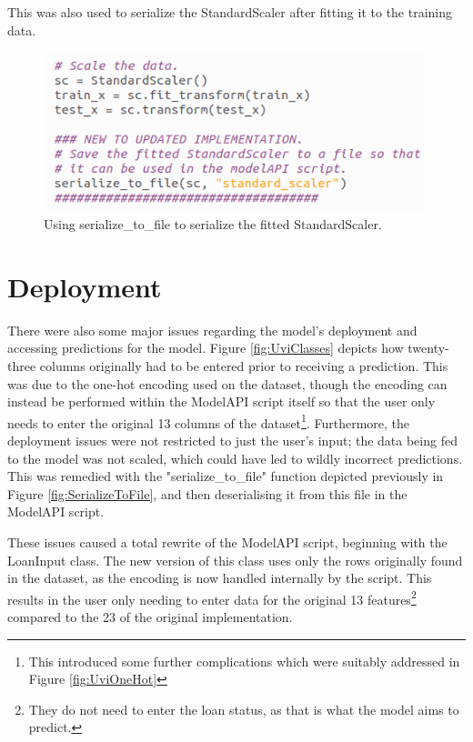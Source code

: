 \documentclass[12pt]{report}
\newcommand{\para}{\vspace{7pt}\noindent}
\begin{document}
\noindent This was also used to serialize the StandardScaler after fitting it to the training data.

\begin{figure}[H]
    \centering
    \includegraphics[width=\linewidth]{Implementation/JAN 10 UPDATES/ScalerSerialize.png}
    \caption{Using serialize\_to\_file to serialize the fitted StandardScaler.}
    \label{fig:SerializeScaler}
\end{figure}

\section{Deployment}\label{subsec:NewDeployment}

There were also some major issues regarding the model's deployment and accessing predictions for the model. Figure \ref{fig:UviClasses} 
depicts how twenty-three columns originally had to be entered prior to receiving a prediction. This was due to the one-hot encoding 
used on the dataset, though the encoding can instead be performed within the ModelAPI script itself so that the user only needs to
enter the original 13 columns of the dataset\footnote{This introduced some further complications which were suitably addressed in Figure \ref{fig:UviOneHot}}. 
Furthermore, the deployment issues were not restricted to just the user's input; the data being fed to the model was not scaled,
which could have led to wildly incorrect predictions. This was remedied with the "serialize\_to\_file" function depicted previously in 
Figure \ref{fig:SerializeToFile}, and then deserialising it from this file in the ModelAPI script.

\para These issues caused a total rewrite of the ModelAPI script, beginning with the LoanInput class. The new version of 
this class uses only the rows originally found in the dataset, as the encoding is now handled internally by the script.
This results in the user only needing to enter data for the original 13 features\footnote{They do not need to enter the loan status, as that is what the model aims to predict.}
compared to the 23 of the original implementation.
\end{document}
